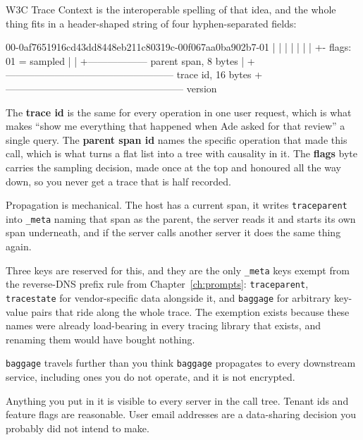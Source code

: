 W3C Trace Context is the interoperable spelling of that idea, and the whole
thing fits in a header-shaped string of four hyphen-separated fields:

\begin{plain}
00-0af7651916cd43dd8448eb211c80319c-00f067aa0ba902b7-01
|  |                                |                |
|  |                                |                +- flags: 01 = sampled
|  |                                +------------------ parent span, 8 bytes
|  +--------------------------------------------------- trace id, 16 bytes
+------------------------------------------------------ version
\end{plain}

The \textbf{trace id} is the same for every operation in one user request, which is what makes ``show me everything that happened when Ade asked for that
review'' a single query. The \textbf{parent span id}
names the specific operation that made this call, which is what turns a flat
list into a tree with causality in it. The \textbf{flags} byte carries the
sampling decision, made once at the top and honoured all the way down, so you
never get a trace that is half recorded.

Propagation is mechanical. The host has a current span, it writes
\texttt{traceparent} into \texttt{\_meta} naming that span as the parent, the
server reads it and starts its own span underneath, and if the server calls
another server it does the same thing again.

Three keys are reserved for this, and they are the only \texttt{\_meta} keys
exempt from the reverse-DNS prefix rule from Chapter~\ref{ch:prompts}:
\texttt{traceparent}, \texttt{tracestate} for vendor-specific data alongside it,
and \texttt{baggage} for arbitrary key-value pairs that ride along the whole
trace. The exemption exists because these names were already load-bearing in
every tracing library that exists, and renaming them would have bought nothing.

\begin{dangerbox}{\texttt{baggage} travels further than you think}
\texttt{baggage} propagates to every downstream service, including ones you do
not operate, and it is not encrypted.

Anything you put in it is visible to every server in the call tree. Tenant ids
and feature flags are reasonable. User email addresses are a data-sharing
decision you probably did not intend to make.
\end{dangerbox}

